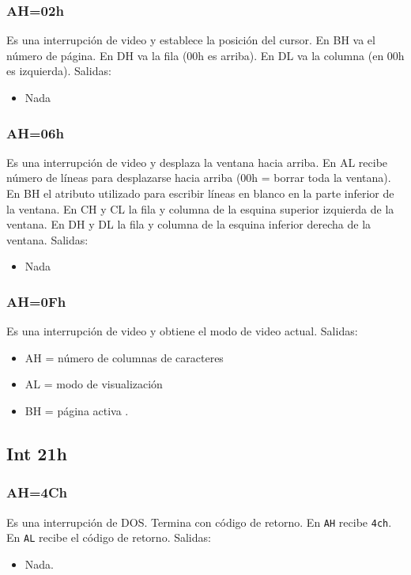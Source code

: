 \documentclass[journal]{../../IEEEtran/IEEEtran}
\begin{document}
\subsubsection{AH=02h}
Es una interrupción de video y establece la posición del
cursor\cite{int10_02h}. En BH va el número de página. En DH va la fila
(00h es arriba). En DL va la columna (en 00h es izquierda). Salidas:
\begin{itemize}
\item Nada
\end{itemize}

\subsubsection{AH=06h}
Es una interrupción de video y desplaza la ventana hacia
arriba\cite{int10_06h}. En AL recibe número de líneas para desplazarse
hacia arriba (00h = borrar toda la ventana). En BH el atributo
utilizado para escribir líneas en blanco en la parte inferior de la
ventana. En CH y CL la fila y columna de la esquina superior izquierda
de la ventana. En DH y DL la fila y columna de la esquina inferior
derecha de la ventana. Salidas:
\begin{itemize}
\item Nada
\end{itemize}


\subsubsection{AH=0Fh}
Es una interrupción de video y obtiene el modo de video
actual\cite{Int10_0Fh}. Salidas:
\begin{itemize}
\item AH = número de columnas de caracteres
\item AL = modo de visualización
\item BH = página activa .
\end{itemize}



\subsection{Int 21h}

\subsubsection{AH=4Ch}
Es una interrupción de DOS. Termina con código de
retorno\cite{int21_4c}. En \verb|AH| recibe \verb|4ch|. En \verb|AL|
recibe el código de retorno. Salidas:
\begin{itemize}
\item Nada.
\end{itemize}
\end{document}
